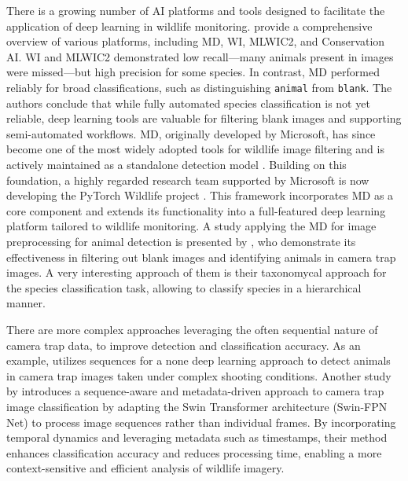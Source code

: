 
There is a growing number of \ac{AI} platforms and tools designed to facilitate the application of deep learning in wildlife monitoring.
\textcite{velezChoosingAppropriatePlatform2022} provide a comprehensive overview of various platforms, including \ac{MD}, \ac{WI}, \ac{MLWIC2}, and Conservation \ac{AI}.
\ac{WI} and \ac{MLWIC2} demonstrated low recall—many animals present in images were missed—but high precision for some species.
In contrast, \ac{MD} performed reliably for broad classifications, such as distinguishing \texttt{animal} from \texttt{blank}.
The authors conclude that while fully automated species classification is not yet reliable, deep learning tools are valuable for filtering blank images and supporting semi-automated workflows.
\ac{MD}, originally developed by Microsoft, has since become one of the most widely adopted tools for wildlife image filtering and is actively maintained as a standalone detection model \autocite{morrisEfficientPipelineCamera2025}.
Building on this foundation, a highly regarded research team supported by Microsoft is now developing the PyTorch Wildlife project \autocite{hernandezPytorchWildlifeCollaborativeDeep2024}.
This framework incorporates \ac{MD} as a core component and extends its functionality into a full-featured deep learning platform tailored to wildlife monitoring.
A study applying the \ac{MD} for image preprocessing for animal detection is presented by \textcite{schneiderRecognitionEuropeanMammals2024}, who demonstrate its effectiveness in filtering out blank images and identifying animals in camera trap images.
A very interesting approach of them is their taxonomycal approach for the species classification task, allowing to classify species in a hierarchical manner.




There are more complex approaches leveraging the often sequential nature of camera trap data, to improve detection and classification accuracy.
As an example, \textcite{zotinANIMALDETECTIONUSING2019} utilizes sequences for a none deep learning approach to detect animals in camera trap images taken under complex shooting conditions.
Another study by \textcite{muhammadTemporalSwinFPNNetNovel2024} introduces a sequence-aware and metadata-driven approach to camera trap image classification by adapting the Swin Transformer architecture (Swin-FPN Net) to process image sequences rather than individual frames. 
By incorporating temporal dynamics and leveraging metadata such as timestamps, their method enhances classification accuracy and reduces processing time, enabling a more context-sensitive and efficient analysis of wildlife imagery.




